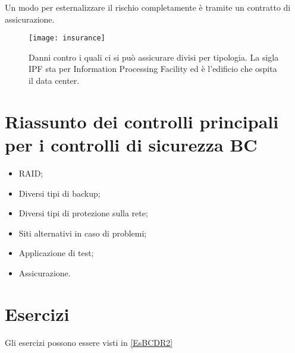 Un modo per esternalizzare il rischio completamente è tramite un contratto di
assicurazione.

\begin{figure}[H]
\centering
\texttt{[image: insurance]}
\caption[Danni contro i quali ci si può assicurare divisi per
tipologia]{Danni contro i quali ci si può assicurare divisi per
tipologia. La sigla IPF sta per Information Processing Facility
ed è l'edificio che ospita il data center.}
\label{fig:insurance}
\end{figure}


\section{Riassunto dei controlli principali per i controlli di sicurezza BC}

\begin{itemize}
  \item RAID;
  \item Diversi tipi di backup;
  \item Diversi tipi di protezione sulla rete;
  \item Siti alternativi in caso di problemi;
  \item Applicazione di test;
  \item Assicurazione.
\end{itemize}

\section{Esercizi}

Gli esercizi possono essere visti in \ref{EsBCDR2}
